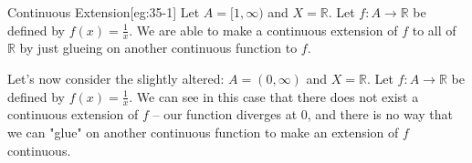 \begin{egBox}{Continuous Extension}[eg:35-1]
    Let \( A = [ 1, \infty ) \) and \( X = \mathbb{R} \). 
    Let \( f: A \rightarrow \mathbb{R} \) be defined by \( f ( x ) = \frac{ 1 }{ x } \).
    We are able to make a continuous extension of \( f \) to all of \( \mathbb{R} \)
    by just glueing on another continuous function to \( f \). 

    \baseSkip

    Let's now consider the slightly altered: \( A = ( 0, \infty ) \)
    and \( X = \mathbb{R} \). 
    Let \( f: A \rightarrow \mathbb{R} \) be defined by \( f ( x ) = \frac{ 1 }{ x } \).
    We can see in this case that there does not exist a continuous extension of 
    \( f \) -- our function diverges at \( 0 \), and there is no way that we can 
    "glue" on another continuous function to make an extension of \( f \) continuous. 
\end{egBox}